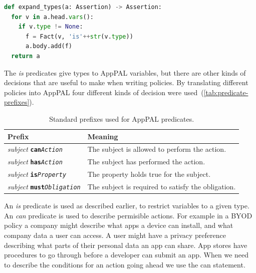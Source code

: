 \documentclass[thesis.tex]{subfiles}
\begin{document}
\begin{lstlisting}[language=Python, float, caption={Procedure used to expand types from AppPAL into SecPAL.}]
def expand_types(a: Assertion) -> Assertion:
  for v in a.head.vars():
    if v.type != None:
      f = Fact(v, 'is'++str(v.type))
      a.body.add(f)
  return a
\end{lstlisting}

The \emph{is} predicates give types to AppPAL variables, but there are other kinds of decisions that are useful to make when writing policies. 
By translating different policies into AppPAL four different kinds of decision were used~(\autoref{tab:predicate-prefixes}).

\newcommand{\descPred}[2]{\emph{subject} \texttt{\textbf{#1}\emph{#2}}}
\begin{table}
  \begin{tabular}{l l}
    \toprule
    Prefix                      & Meaning                                            \\
    \midrule
    \descPred{can}{Action}      & The subject is allowed to perform the action.      \\
    \descPred{has}{Action}      & The subject has performed the action.              \\
    \descPred{is}{Property}     & The property holds true for the subject.           \\
    \descPred{must}{Obligation} & The subject is required to satisfy the obligation. \\
    \bottomrule
  \end{tabular}
  \caption{Standard prefixes used for AppPAL predicates.}
  \label{tab:predicate-prefixes}
\end{table}

An \emph{is} predicate is used as described earlier, to restrict variables to a given type.
An \emph{can} predicate is used to describe permisible actions.  
For example in a \ac{BYOD} policy a company might describe what apps a device can install, and what company data a user can access.
A user might have a privacy preference describing what parts of their personal data an app can share.
App stores have procedures to go through before a developer can submit an app. 
When we need to describe the conditions for an action going ahead we use the can statement.
\end{document}
